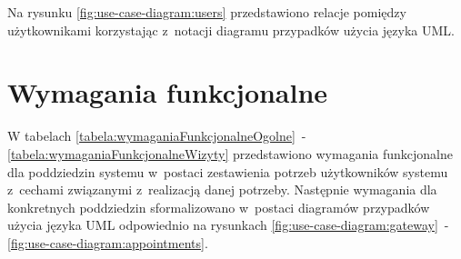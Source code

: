 Na rysunku \ref{fig:use-case-diagram:users} przedstawiono relacje pomiędzy użytkownikami korzystając z~notacji diagramu przypadków użycia języka UML.


\section{Wymagania funkcjonalne}\label{sec:functional-requirements}
\par
W tabelach \ref{tabela:wymaganiaFunkcjonalneOgolne}~- \ref{tabela:wymaganiaFunkcjonalneWizyty} przedstawiono wymagania funkcjonalne dla poddziedzin systemu w~postaci zestawienia potrzeb użytkowników systemu z~cechami związanymi z~realizacją danej potrzeby.
Następnie wymagania dla konkretnych poddziedzin sformalizowano w~postaci diagramów przypadków użycia języka UML odpowiednio na rysunkach \ref{fig:use-case-diagram:gateway}~- \ref{fig:use-case-diagram:appointments}.

